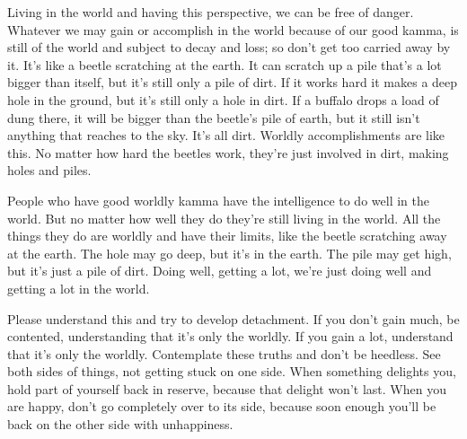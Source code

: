 Living in the world and having this perspective, we can be free of danger. Whatever we may gain or accomplish in the world because of our good kamma, is still of the world and subject to decay and loss; so don't get too carried away by it. It's like a beetle scratching at the earth. It can scratch up a pile that's a lot bigger than itself, but it's still only a pile of dirt. If it works hard it makes a deep hole in the ground, but it's still only a hole in dirt. If a buffalo drops a load of dung there, it will be bigger than the beetle's pile of earth, but it still isn't anything that reaches to the sky. It's all dirt. Worldly accomplishments are like this. No matter how hard the beetles work, they're just involved in dirt, making holes and piles. 

People who have good worldly kamma have the intelligence to do well in the world. But no matter how well they do they're still living in the world. All the things they do are worldly and have their limits, like the beetle scratching away at the earth. The hole may go deep, but it's in the earth. The pile may get high, but it's just a pile of dirt. Doing well, getting a lot, we're just doing well and getting a lot in the world. 

Please understand this and try to develop detachment. If you don't gain much, be contented, understanding that it's only the worldly. If you gain a lot, understand that it's only the worldly. Contemplate these truths and don't be heedless. See both sides of things, not getting stuck on one side. When something delights you, hold part of yourself back in reserve, because that delight won't last. When you are happy, don't go completely over to its side, because soon enough you'll be back on the other side with unhappiness. 
